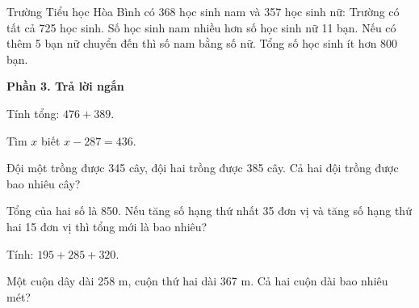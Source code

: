 \begin{ex} %
Trường Tiểu học Hòa Bình có 368 học sinh nam và 357 học sinh nữ:
\choiceTF
{\True Trường có tất cả 725 học sinh.}
{\True Số học sinh nam nhiều hơn số học sinh nữ 11 bạn.}
{Nếu có thêm 5 bạn nữ chuyển đến thì số nam bằng số nữ.}
{\True Tổng số học sinh ít hơn 800 bạn.}
\end{ex}

\textbf{Phần 3. Trả lời ngắn}

\begin{ex} %
Tính tổng: $476 + 389$.
\end{ex}

\begin{ex} %
Tìm $x$ biết $x - 287 = 436$.
\end{ex}

\begin{ex} %
Đội một trồng được 345 cây, đội hai trồng được 385 cây. Cả hai đội trồng được bao nhiêu cây?
\end{ex}

\begin{ex} %
Tổng của hai số là 850. Nếu tăng số hạng thứ nhất 35 đơn vị và tăng số hạng thứ hai 15 đơn vị thì tổng mới là bao nhiêu?
\end{ex}

\begin{ex} %
Tính: $195 + 285 + 320$.
\end{ex}

\begin{ex} %
Một cuộn dây dài 258 m, cuộn thứ hai dài 367 m. Cả hai cuộn dài bao nhiêu mét?
\end{ex}

